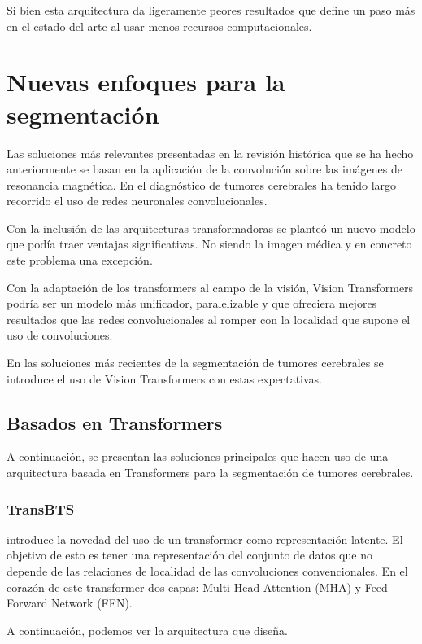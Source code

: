 		Si bien esta arquitectura da ligeramente peores resultados que \cite{myronenko20193d} define un paso más en el estado del arte al usar menos recursos computacionales.


\section{Nuevas enfoques para la segmentación}

	Las soluciones más relevantes presentadas en la revisión histórica que se ha hecho anteriormente se basan en la aplicación de la convolución sobre las imágenes de resonancia magnética. En el diagnóstico de tumores cerebrales ha tenido largo recorrido el uso de redes neuronales convolucionales. 
	
	Con la inclusión de las arquitecturas transformadoras se planteó un nuevo modelo que podía traer ventajas significativas. No siendo la imagen médica y en concreto este problema una excepción.
	
	Con la adaptación de los transformers al campo de la visión, Vision Transformers podría ser un modelo más unificador, paralelizable y que ofreciera mejores resultados que las redes convolucionales al romper con la localidad que supone el uso de convoluciones. 
	
	En las soluciones más recientes de la segmentación de tumores cerebrales se introduce el uso de Vision Transformers con estas expectativas.
	
	\subsection{Basados en Transformers}
	
	A continuación, se presentan las soluciones principales que hacen uso de una arquitectura basada en Transformers para la segmentación de tumores cerebrales.
	
	\subsubsection{TransBTS}
	
	\cite{wenxuan2021transbts} introduce la novedad del uso de un transformer como representación latente. El objetivo de esto es tener una representación del conjunto de datos que no depende de las relaciones de localidad de las convoluciones convencionales. En el corazón de este transformer dos capas: Multi-Head Attention (MHA) y Feed Forward Network (FFN).
	
	A continuación, podemos ver la arquitectura que diseña.
	
